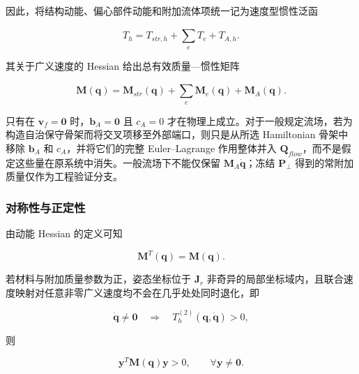 因此，将结构动能、偏心部件动能和附加流体项统一记为速度型惯性泛函

\begin{equation}
\label{eq:galerkin-2-60}
T_{h} = T_{str,h} + \sum_{e}^{}T_{e} + T_{A,h}.
\end{equation}

其关于广义速度的 Hessian 给出总有效质量---惯性矩阵

\begin{equation}
\label{eq:galerkin-2-61}
\boxed{\mathbf{M}\left( \mathbf{q} \right) = \mathbf{M}_{str}\left( \mathbf{q} \right) + \sum_{e}^{}\mathbf{M}_{e}\left( \mathbf{q} \right) + \mathbf{M}_{A}\left( \mathbf{q} \right).}
\end{equation}

只有在 \(\mathbf{v}_{f} = \mathbf{0}\) 时，\(\mathbf{b}_{A} = \mathbf{0}\) 且 \(c_{A} = 0\) 才在物理上成立。对于一般规定流场，若为构造自治保守骨架而将交叉项移至外部端口，则只是从所选 Hamiltonian 骨架中移除 \(\mathbf{b}_{A}\) 和 \(c_{A}\)，并将它们的完整 Euler--Lagrange 作用整体并入 \(\mathbf{Q}_{flow}\)，而不是假定这些量在原系统中消失。一般流场下不能仅保留 \(\mathbf{M}_{A}\dot{\mathbf{q}}\)；冻结 \(\mathbf{P}_{\bot}\) 得到的常附加质量仅作为工程验证分支。

\subsubsection{对称性与正定性}\label{sec:galerkin-2-4-7}

由动能 Hessian 的定义可知

\begin{equation}
\label{eq:galerkin-2-62}
\mathbf{M}^{T}\left( \mathbf{q} \right) = \mathbf{M}\left( \mathbf{q} \right).
\end{equation}

若材料与附加质量参数为正，姿态坐标位于 \(\mathbf{J}_{r}\) 非奇异的局部坐标域内，且联合速度映射对任意非零广义速度均不会在几乎处处同时退化，即

\begin{equation}
\label{eq:galerkin-2-63}
\dot{\mathbf{q}} \neq \mathbf{0}\quad \Rightarrow \quad T_{h}^{(2)}\left( \mathbf{q},\dot{\mathbf{q}} \right) > 0,
\end{equation}

则

\begin{equation}
\label{eq:galerkin-2-64}
\mathbf{y}^{T}\mathbf{M}\left( \mathbf{q} \right)\mathbf{y} > 0,\quad\quad\forall\mathbf{y} \neq \mathbf{0}.
\end{equation}

